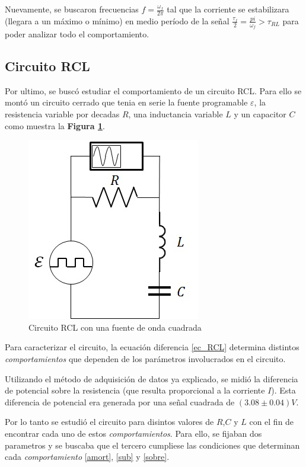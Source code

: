 \documentclass[11pt,a4paper]{article}
\begin{document}
Nuevamente, se buscaron frecuencias $f = \frac{\omega_f}{2\pi}$ tal que la corriente se estabilizara (llegara a un máximo o mínimo) en medio período de la señal $\frac{\tau_f}{2} = \frac{pi}{\omega_f} > \tau_{RL}$ para poder analizar todo el comportamiento.

\subsection{Circuito RCL}

Por ultimo, se buscó estudiar el comportamiento de un circuito RCL. Para ello se montó un circuito cerrado que tenia en serie la fuente programable $\varepsilon$, la resistencia variable por decadas $R$, una inductancia variable $L$ y un capacitor $C$ como muestra la \textbf{Figura \ref{fig:RCL}}.  

\begin{figure}[h]
\centering
\includegraphics[scale=0.7]{Circuito-RCL}
  \caption{Circuito RCL con una fuente de onda cuadrada}
  \label{fig:RCL}
\end{figure}

Para caracterizar el circuito, la ecuación diferencia \eqref{ec_RCL} determina distintos \textit{comportamientos} que dependen de los parámetros involucrados en el circuito.

Utilizando el método de adquisición de datos ya explicado, se midió la diferencia de potencial sobre la resistencia (que resulta proporcional a la corriente $I$). Esta diferencia de potencial era generada por una señal cuadrada de $(3.08 \pm 0.04)V$.

Por lo tanto se estudió el circuito para disintos valores de $R$,$C$ y $L$ con el fin de encontrar cada uno de estos \textit{comportamientos}. Para ello, se fijaban dos parametros y se buscaba que el tercero cumpliese las condiciones  que determinan cada \textit{comportamiento} \eqref{amort}, \eqref{sub} y \eqref{sobre}.
\end{document}
